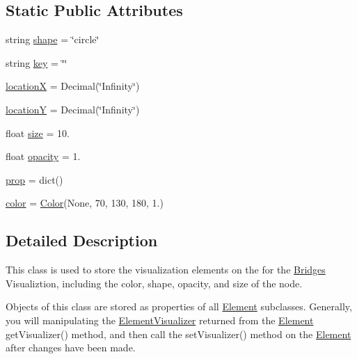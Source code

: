 \subsection*{Static Public Attributes}
\begin{DoxyCompactItemize}
\item 
string \mbox{\hyperlink{class_bridges_1_1_element_visualizer_1_1_element_visualizer_a1ae8dcb88a4ccb84df24aafed271ea7f}{shape}} = \char`\"{}circle\char`\"{}
\item 
string \mbox{\hyperlink{class_bridges_1_1_element_visualizer_1_1_element_visualizer_ae811539c6b7d514dcaead30f0288c87d}{key}} = \char`\"{}\char`\"{}
\item 
\mbox{\hyperlink{class_bridges_1_1_element_visualizer_1_1_element_visualizer_af7cd9fba1cd632efc802156d5f358c23}{locationX}} = Decimal(\char`\"{}Infinity\char`\"{})
\item 
\mbox{\hyperlink{class_bridges_1_1_element_visualizer_1_1_element_visualizer_a8905c116a3b0c9f0d0dc7784f4677804}{locationY}} = Decimal(\char`\"{}Infinity\char`\"{})
\item 
float \mbox{\hyperlink{class_bridges_1_1_element_visualizer_1_1_element_visualizer_a5d3eefae7745c6db65147c7b1361d208}{size}} = 10.
\item 
float \mbox{\hyperlink{class_bridges_1_1_element_visualizer_1_1_element_visualizer_ab26841a89ad63bac0828c15b01ec92b2}{opacity}} = 1.
\item 
\mbox{\hyperlink{class_bridges_1_1_element_visualizer_1_1_element_visualizer_a16321e9ca1451a4eb1e2b58d22fa3211}{prop}} = dict()
\item 
\mbox{\hyperlink{class_bridges_1_1_element_visualizer_1_1_element_visualizer_ab067bb0c9acc370a93b87f15bd7d6e6e}{color}} = \mbox{\hyperlink{class_bridges_1_1_color_1_1_color}{Color}}(None, 70, 130, 180, 1.)
\end{DoxyCompactItemize}


\subsection{Detailed Description}
This class is used to store the visualization elements on the for the \mbox{\hyperlink{namespace_bridges_1_1_bridges}{Bridges}} Visualiztion, including the color, shape, opacity, and size of the node. 

Objects of this class are stored as properties of all \mbox{\hyperlink{namespace_bridges_1_1_element}{Element}} subclasses. Generally, you will manipulating the \mbox{\hyperlink{class_bridges_1_1_element_visualizer_1_1_element_visualizer}{Element\+Visualizer}} returned from the \mbox{\hyperlink{namespace_bridges_1_1_element}{Element}} get\+Visualizer() method, and then call the set\+Visualizer() method on the \mbox{\hyperlink{namespace_bridges_1_1_element}{Element}} after changes have been made. 

